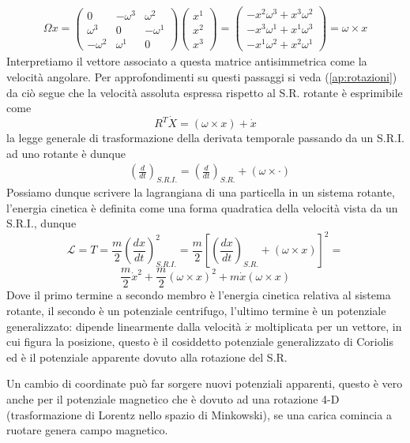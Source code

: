 \documentclass[
10pt, %
a4paper, %
oneside, %
headinclude,footinclude, %
BCOR5mm, %
]{scrartcl}
\begin{document}
\begin{esempio}
	\begin{align*}
			\Omega x = 
			\begin{pmatrix}
				0&-\omega^3&\omega^2\\
			\omega^3&0&-\omega^1\\
			-\omega^2&\omega^1&0
			\end{pmatrix}
			\begin{pmatrix}
				x^1\\
				x^2\\
				x^3
			\end{pmatrix}=
			\begin{pmatrix}
				-x^2\omega^3+x^3\omega^2\\
				-x^3\omega^1+x^1\omega^3\\
				-x^1\omega^2+x^2\omega^1
			\end{pmatrix}=
			 \omega\times x
	\end{align*}
	Interpretiamo il vettore associato a questa matrice antisimmetrica come la velocità angolare. Per approfondimenti su questi passaggi si veda (\ref{ap:rotazioni})\\
	da ciò segue che la velocità assoluta espressa rispetto al S.R. rotante è esprimibile come 
	\[R^T\dot{X} = (\omega\times x)+ \dot{x}\]
	la legge generale di trasformazione della derivata temporale passando da un S.R.I. ad uno rotante è dunque
	\begin{align}\label{eq:derivata-rotante}
	&\left(\frac{d}{dt}\right)_{S.R.I.} = \left(\frac{d}{dt}\right)_{S.R.}+ (\omega\times \cdot)
	\end{align}
	Possiamo dunque scrivere la lagrangiana di una particella in un sistema rotante, l'energia cinetica è definita come una forma quadratica della velocità vista da un S.R.I., dunque
	\[\mathcal{L} = T = \frac{m}{2}\left(\frac{dx}{dt}\right)_{S.R.I.}^2 = \frac{m}{2}\left[\left(\frac{dx}{dt}\right)_{S.R.}+ (\omega\times x)\right]^2 =\]
	\[ \frac{m}{2} \dot{x}^2 + \frac{m}{2}(\omega\times x)^2+m\dot{x}(\omega\times x)\]
	Dove il primo termine a secondo membro è l'energia cinetica relativa al sistema rotante, il secondo è un potenziale centrifugo, l'ultimo termine è un potenziale generalizzato: dipende linearmente dalla velocità $\dot{x}$ moltiplicata per un vettore, in cui figura la posizione, questo è il cosiddetto potenziale generalizzato di Coriolis ed è il potenziale apparente dovuto alla rotazione del S.R. 
	\begin{osservazione}
		Un cambio di coordinate può far sorgere nuovi potenziali apparenti, questo è vero anche per il potenziale magnetico che è dovuto ad una rotazione 4-D (trasformazione di Lorentz nello spazio di Minkowski), se una carica comincia a ruotare genera campo magnetico. 

\end{osservazione}
\end{esempio}
\end{document}
